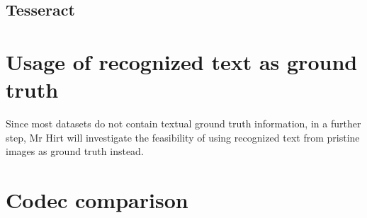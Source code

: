 \subsection{Tesseract}
\label{subsec:tesseract}

\section{Usage of recognized text as ground truth}
\label{sec:usage_of_recognized_text_as_ground_truth}

Since most datasets do not contain textual ground truth information,
in a further step, Mr Hirt will investigate the feasibility of
using recognized text from pristine images as ground truth instead.

\section{Codec comparison}
\label{sec:codec_comparison}
